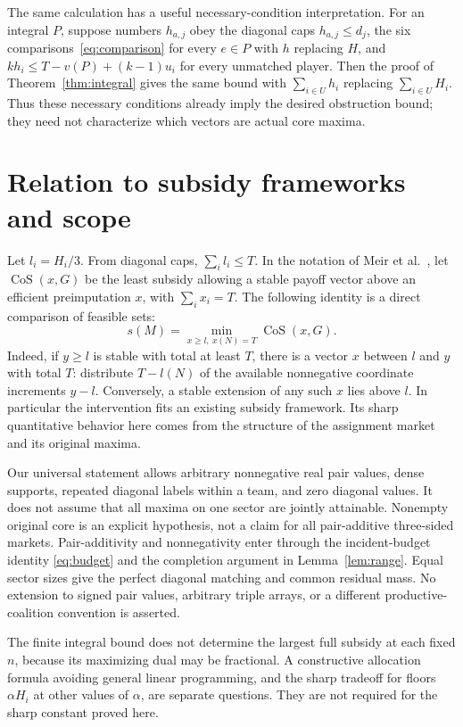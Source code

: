 \documentclass[11pt]{article}
\theoremstyle{remark}
\begin{document}
The same calculation has a useful necessary-condition interpretation.
For an integral $P$, suppose numbers $h_{a,j}$ obey the diagonal caps
$h_{a,j}\le d_j$, the six comparisons~\eqref{eq:comparison} for every
$e\in P$ with $h$ replacing $H$, and
$kh_i\le T-v(P)+(k-1)u_i$ for every unmatched player.
Then the proof of Theorem~\ref{thm:integral} gives the same bound with
$\sum_{i\in U}h_i$ replacing $\sum_{i\in U}H_i$.
Thus these necessary conditions already imply the desired obstruction
bound; they need not characterize which vectors are actual core maxima.

\section{Relation to subsidy frameworks and scope}\label{sec:framework}
Let $l_i=H_i/3$. From diagonal caps, $\sum_i l_i\le T$.
In the notation of Meir et al.~\cite[Section~2.2]{Meir2011}, let
$\operatorname{CoS}(x,G)$ be the least subsidy allowing a stable payoff
vector above an efficient preimputation $x$, with $\sum_ix_i=T$.
The following identity is a direct comparison of feasible sets:
\begin{equation}\label{eq:cos}
       s(M)=\min_{x\ge l,\ x(N)=T}\operatorname{CoS}(x,G).
\end{equation}
Indeed, if $y\ge l$ is stable with total at least $T$, there is a vector
$x$ between $l$ and $y$ with total $T$: distribute $T-l(N)$ of the
available nonnegative coordinate increments $y-l$. Conversely, a stable
extension of any such $x$ lies above $l$. In particular the intervention
fits an existing subsidy framework. Its sharp quantitative behavior here
comes from the structure of the assignment market and its original maxima.

Our universal statement allows arbitrary nonnegative real pair values,
dense supports, repeated diagonal labels within a team, and zero diagonal
values. It does not assume that all maxima on one sector are jointly
attainable. Nonempty original core is an explicit hypothesis, not a
claim for all pair-additive three-sided markets. Pair-additivity and
nonnegativity enter through the incident-budget identity
\eqref{eq:budget} and the completion argument in Lemma~\ref{lem:range}.
Equal sector sizes give the perfect diagonal matching and common residual
mass. No extension to signed pair values, arbitrary triple arrays, or a
different productive-coalition convention is asserted.

The finite integral bound does not determine the largest full subsidy at
each fixed $n$, because its maximizing dual may be fractional. A constructive
allocation formula avoiding general linear programming, and the sharp
tradeoff for floors $\alpha H_i$ at other values of $\alpha$, are separate
questions. They are not required for the sharp constant proved here.
\end{document}

